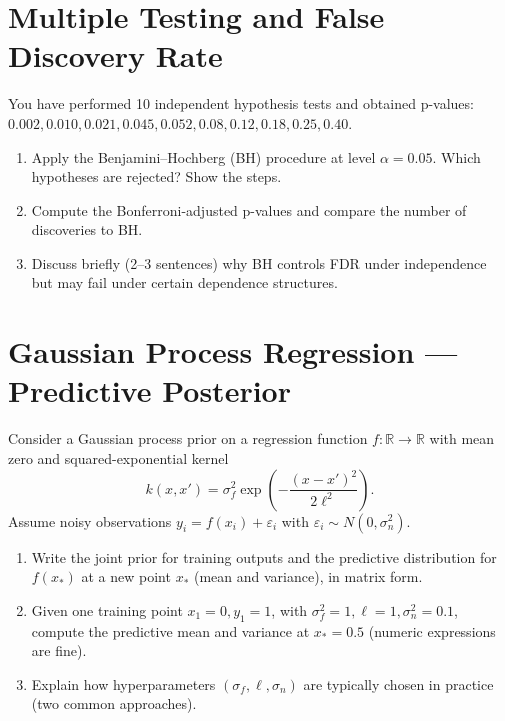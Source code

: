 \documentclass[12pt,a4paper]{article}
\begin{document}


\section{Multiple Testing and False Discovery Rate}
You have performed 10 independent hypothesis tests and obtained p-values:
\(0.002, 0.010, 0.021, 0.045, 0.052, 0.08, 0.12, 0.18, 0.25, 0.40\).
\begin{enumerate}[label=(\arabic*)]
\item Apply the Benjamini–Hochberg (BH) procedure at level \(\alpha=0.05\). Which hypotheses are rejected? Show the steps.
\item Compute the Bonferroni-adjusted p-values and compare the number of discoveries to BH.
\item Discuss briefly (2–3 sentences) why BH controls FDR under independence but may fail under certain dependence structures.
\end{enumerate}

\section{Gaussian Process Regression — Predictive Posterior}
Consider a Gaussian process prior on a regression function \(f:\mathbb{R}\to\mathbb{R}\) with mean zero and squared-exponential kernel
\[ k(x,x') = \sigma_f^2 \exp\left(-\frac{(x-x')^2}{2\ell^2}\right). \]
Assume noisy observations \(y_i = f(x_i) + \varepsilon_i\) with \(\varepsilon_i\sim N(0,\sigma_n^2)\).
\begin{enumerate}[label=(\arabic*)]
\item Write the joint prior for training outputs and the predictive distribution for \(f(x_*)\) at a new point \(x_*\) (mean and variance), in matrix form.
\item Given one training point \(x_1=0,y_1=1\), with \(\sigma_f^2=1,\ell=1,\sigma_n^2=0.1\), compute the predictive mean and variance at \(x_*=0.5\) (numeric expressions are fine).
\item Explain how hyperparameters \((\sigma_f,\ell,\sigma_n)\) are typically chosen in practice (two common approaches).
\end{enumerate}
\end{document}
